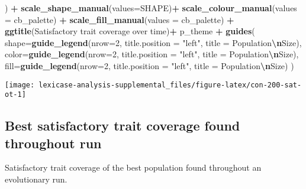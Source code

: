 \documentclass[
]{book}
\newenvironment{Shaded}{\begin{snugshade}}{\end{snugshade}}
\newcommand{\AttributeTok}[1]{\textcolor[rgb]{0.13,0.29,0.53}{#1}}
\newcommand{\DecValTok}[1]{\textcolor[rgb]{0.00,0.00,0.81}{#1}}
\newcommand{\FunctionTok}[1]{\textcolor[rgb]{0.13,0.29,0.53}{\textbf{#1}}}
\newcommand{\NormalTok}[1]{#1}
\newcommand{\SpecialCharTok}[1]{\textcolor[rgb]{0.81,0.36,0.00}{\textbf{#1}}}
\newcommand{\StringTok}[1]{\textcolor[rgb]{0.31,0.60,0.02}{#1}}
\begin{document}
\begin{Shaded}
\begin{Highlighting}[]
\NormalTok{  ) }\SpecialCharTok{+}
  \FunctionTok{scale\_shape\_manual}\NormalTok{(}\AttributeTok{values=}\NormalTok{SHAPE)}\SpecialCharTok{+}
  \FunctionTok{scale\_colour\_manual}\NormalTok{(}\AttributeTok{values =}\NormalTok{ cb\_palette) }\SpecialCharTok{+}
  \FunctionTok{scale\_fill\_manual}\NormalTok{(}\AttributeTok{values =}\NormalTok{ cb\_palette) }\SpecialCharTok{+}
  \FunctionTok{ggtitle}\NormalTok{(}\StringTok{\textquotesingle{}Satisfactory trait coverage over time\textquotesingle{}}\NormalTok{)}\SpecialCharTok{+}
\NormalTok{  p\_theme }\SpecialCharTok{+}
  \FunctionTok{guides}\NormalTok{(}
    \AttributeTok{shape=}\FunctionTok{guide\_legend}\NormalTok{(}\AttributeTok{nrow=}\DecValTok{2}\NormalTok{, }\AttributeTok{title.position =} \StringTok{"left"}\NormalTok{, }\AttributeTok{title =} \StringTok{\textquotesingle{}Population}\SpecialCharTok{\textbackslash{}n}\StringTok{Size\textquotesingle{}}\NormalTok{),}
    \AttributeTok{color=}\FunctionTok{guide\_legend}\NormalTok{(}\AttributeTok{nrow=}\DecValTok{2}\NormalTok{, }\AttributeTok{title.position =} \StringTok{"left"}\NormalTok{, }\AttributeTok{title =} \StringTok{\textquotesingle{}Population}\SpecialCharTok{\textbackslash{}n}\StringTok{Size\textquotesingle{}}\NormalTok{),}
    \AttributeTok{fill=}\FunctionTok{guide\_legend}\NormalTok{(}\AttributeTok{nrow=}\DecValTok{2}\NormalTok{, }\AttributeTok{title.position =} \StringTok{"left"}\NormalTok{, }\AttributeTok{title =} \StringTok{\textquotesingle{}Population}\SpecialCharTok{\textbackslash{}n}\StringTok{Size\textquotesingle{}}\NormalTok{)}
\NormalTok{  )}
\end{Highlighting}
\end{Shaded}

\texttt{[image: lexicase-analysis-supplemental\_files/figure-latex/con-200-sat-ot-1]}

\hypertarget{best-satisfactory-trait-coverage-found-throughout-run-2}{%
\subsection{Best satisfactory trait coverage found throughout run}\label{best-satisfactory-trait-coverage-found-throughout-run-2}}

Satisfactory trait coverage of the best population found throughout an evolutionary run.
\end{document}
